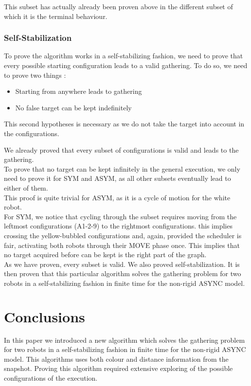 \documentclass[11pt]{article}
\begin{document}
This subset has actually already been proven above in the different subset of which it is the terminal behaviour.

\subsubsection{Self-Stabilization}

To prove the algorithm works in a self-stabilizing fashion, we need to prove that every possible starting configuration leads to a valid gathering. To do so, we need to prove two things : 

\begin{itemize}
\item Starting from anywhere leads to gathering
\item No false target can be kept indefinitely
\end{itemize}

This second hypotheses is necessary as we do not take the target into account in the configurations.

We already proved that every subset of configurations is valid and leads to the gathering. 
\\
To prove that no target can be kept infinitely in the general execution, we only need to prove it for SYM and ASYM, as all other subsets eventually lead to either of them.
\\
This proof is quite trivial for ASYM, as it is a cycle of motion for the white robot.
\\
For SYM, we notice that cycling through the subset requires moving from the leftmost configurations (A1-2-9) to the rightmost configurations. this implies crossing the yellow-bubbled configurations and, again, provided the scheduler is fair, activating both robots through their MOVE phase once. This implies that no target acquired before can be kept is the right part of the graph.
\\

As we have proven, every subset is valid. We also proved self-stabilization. It is then proven that this particular algorithm solves the gathering problem for two robots in a self-stabilizing fashion in finite time for the non-rigid ASYNC model.

\section{Conclusions}

In this paper we introduced a new algorithm which solves the gathering problem for two robots in a self-stabilizing fashion in finite time for the non-rigid ASYNC model. This algorithms uses both colour and distance information from the snapshot. Proving this algorithm required extensive exploring of the possible configurations of the execution.
\end{document}
